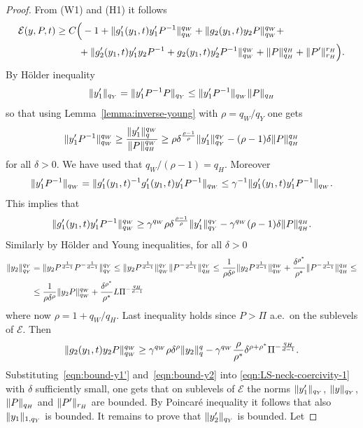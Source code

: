 \documentclass[a4paper,10pt,twoside]{amsbook}
\numberwithin{section}{chapter}
\numberwithin{equation}{chapter}
\theoremstyle{definition}
\DeclarePairedDelimiter{\norm}{\lVert}{\rVert}
\begin{document}
\begin{proof}
From (W1) and (H1) it follows
\begin{equation}
\label{eqn:LS-neck-coercivity-1}
\mathcal{E}(y,P,t)\ge
\begin{multlined}[t]
C\Big(-1+\norm{g_1'(y_1,t)y_1'P^{-1}}_{q_W}^{q_W}+\norm{g_2(y_1,t)y_2P}_{q_W}^{q_W}+\\
+\norm{g_2'(y_1,t)y_1'y_2P^{-1}+g_2(y_1,t)y_2'P^{-1}}_{q_W}^{q_W}+\norm{P}_{q_H}^{q_H}+\norm{P'}_{r_H}^{r_H}\Big).
\end{multlined}
\end{equation}
By H\"older inequality
\[
\norm{y_1'}_{q_Y}=\norm{y_1'P^{-1}P}_{q_Y}\le\norm{y_1'P^{-1}}_{q_W}\norm{P}_{q_H}
\]
so that using Lemma~\ref{lemma:inverse-young} with $\rho=q_W/q_Y$ one gets
\[
\norm{y_1'P^{-1}}_{q_W}^{q_W}\ge\frac{\norm{y_1'}_q^{q_W}}{\norm{P}_{q_H}^{q_W}}\ge\rho\delta^\frac{\rho-1}{\rho}\norm{y_1'}_{q_Y}^{q_Y}-(\rho-1)\delta\norm{P}_{q_H}^{q_H}
\]
for all $\delta>0$. We have used that $q_W/(\rho-1)=q_H$. Moreover
\[
\norm{y_1'P^{-1}}_{q_W}=\norm{g_1'(y_1,t)^{-1}g_1'(y_1,t)y_1'P^{-1}}_{q_W}\le\gamma^{-1}\norm{g_1'(y_1,t)y_1'P^{-1}}_{q_W}.
\]
This implies that
\begin{equation}
\label{eqn:bound-y1'}
\norm{g_1'(y_1,t)y_1'P^{-1}}_{q_W}^{q_W}\ge\gamma^{q_W}\rho\delta^\frac{\rho-1}{\rho}\norm{y_1'}_{q_Y}^{q_Y}-\gamma^{q_W}(\rho-1)\delta\norm{P}_{q_H}^{q_H}.
\end{equation}
Similarly by H\"older and Young inequalities, for all $\delta>0$
\[
\begin{split}
\norm{y_2}_{q_Y}^{q_Y}&=\norm{y_2P^\frac{1}{d-1}P^{-\frac{1}{d-1}}}_{q_Y}^{q_Y}\le\norm{y_2P^\frac{1}{d-1}}_{q_W}^{q_Y}\norm{P^{-\frac{1}{d-1}}}_{q_H}^{q_Y}\le\frac{1}{\rho\delta^\rho}\norm{y_2P^\frac{1}{d-1}}_{q_W}^{q_W}+\frac{\delta^{\rho^*}}{\rho^*}\norm{P^{-\frac{1}{d-1}}}_{q_H}^{q_H}\le\\
&\le\frac{1}{\rho\delta^\rho}\norm{y_2P}_{q_W}^{q_W}+\frac{\delta^{\rho^*}}{\rho^*}L\Pi^{-\frac{q_H}{d-1}}
\end{split}
\]
where now $\rho=1+q_W/q_H$. Last inequality holds since $P>\Pi$ a.e.\ on the sublevels of $\mathcal{E}$. Then
\begin{equation}
\label{eqn:bound-y2}
\norm{g_2(y_1,t)y_2P}_{q_W}^{q_W}\ge\gamma^{q_W}\rho\delta^\rho\norm{y_2}_q^q-\gamma^{q_W}\frac{\rho}{\rho^*}\delta^{\rho+\rho^*}\Pi^{-\frac{q_H}{d-1}}.
\end{equation}
Substituting~\eqref{eqn:bound-y1'} and~\eqref{eqn:bound-y2} into \eqref{eqn:LS-neck-coercivity-1} with $\delta$ sufficiently small, one gets that on sublevels of $\mathcal{E}$ the norms $\norm{y_1'}_{q_Y}$, $\norm{y}_{q_Y}$, $\norm{P}_{q_H}$ and $\norm{P'}_{r_H}$ are bounded. By Poincaré inequality it follows that also $\norm{y_1}_{1,{q_Y}}$ is bounded. It remains to prove that $\norm{y_2'}_{q_Y}$ is bounded. Let

\end{proof}
\end{document}
